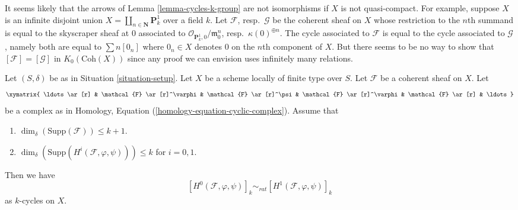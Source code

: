 \begin{remark}
\label{remark-not-true-not-quasi-compact}
It seems likely that the arrows of Lemma \ref{lemma-cycles-k-group}
are not isomorphisms if $X$ is not quasi-compact. For example, suppose $X$ is
an infinite disjoint union $X = \coprod_{n \in \mathbf{N}} \mathbf{P}^1_k$
over a field $k$. Let $\mathcal{F}$, resp.\ $\mathcal{G}$ be the coherent
sheaf on $X$ whose restriction to the $n$th summand is equal to the skyscraper
sheaf at $0$ associated to $\mathcal{O}_{\mathbf{P}^1_k, 0}/\mathfrak m_0^n$,
resp.\ $\kappa(0)^{\oplus n}$. The cycle associated to $\mathcal{F}$ is
equal to the cycle associated to $\mathcal{G}$, namely both are equal to
$\sum n[0_n]$ where $0_n \in X$ denotes $0$ on the $n$th component of $X$.
But there seems to be no way to show that
$[\mathcal{F}] = [\mathcal{G}]$ in $K_0(\text{Coh}(X))$ since
any proof we can envision uses infinitely many relations.
\end{remark}

\begin{lemma}
\label{lemma-maps-between-coherent-sheaves}
Let $(S, \delta)$ be as in Situation \ref{situation-setup}.
Let $X$ be a scheme locally of finite type over $S$.
Let $\mathcal{F}$ be a coherent sheaf on $X$.
Let
$$
\xymatrix{
\ldots \ar[r] &
\mathcal{F} \ar[r]^\varphi &
\mathcal{F} \ar[r]^\psi &
\mathcal{F} \ar[r]^\varphi &
\mathcal{F} \ar[r] & \ldots
}
$$
be a complex as in Homology, Equation (\ref{homology-equation-cyclic-complex}).
Assume that
\begin{enumerate}
\item $\dim_\delta(\text{Supp}(\mathcal{F})) \leq k + 1$.
\item $\dim_\delta(\text{Supp}(H^i(\mathcal{F}, \varphi, \psi))) \leq k$
for $i = 0, 1$.
\end{enumerate}
Then we have
$$
[H^0(\mathcal{F}, \varphi, \psi)]_k
\sim_{rat}
[H^1(\mathcal{F}, \varphi, \psi)]_k
$$
as $k$-cycles on $X$.
\end{lemma}

